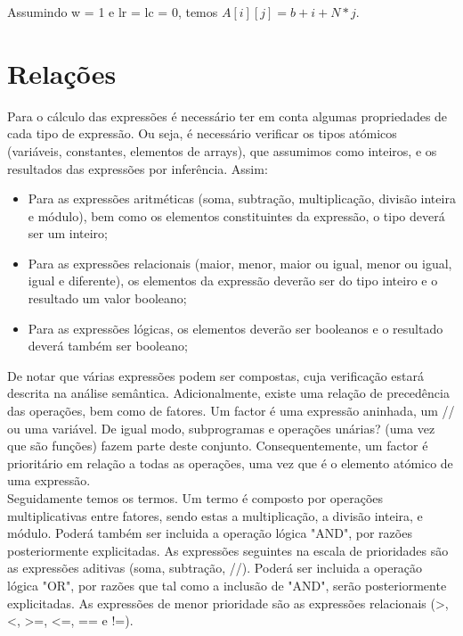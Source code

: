 Assumindo w = 1 e lr = lc = 0, temos $A[i][j] = b + i + N * j$.\\

\section{Relações}
\label{sec:relacoes:analise}

Para o cálculo das expressões é necessário ter em conta algumas propriedades de cada tipo de expressão. Ou seja, é necessário verificar os tipos atómicos (variáveis, constantes, elementos de arrays), que assumimos como inteiros, e os resultados das expressões por inferência. Assim:\\
\begin{itemize}
\item Para as expressões aritméticas (soma, subtração, multiplicação, divisão inteira e módulo), bem como os elementos constituintes da expressão, o tipo deverá ser um inteiro;
\item Para as expressões relacionais (maior, menor, maior ou igual, menor ou igual, igual e diferente), os elementos da expressão deverão ser do tipo inteiro e o resultado um valor booleano;
\item Para as expressões lógicas, os elementos deverão ser booleanos e o resultado deverá também ser booleano;
\end{itemize}

De notar que várias expressões podem ser compostas, cuja verificação estará descrita na análise semântica. Adicionalmente, existe uma relação de precedência das operações, bem como de fatores. Um factor é uma expressão aninhada, um // ou uma variável. De igual modo, subprogramas e operações unárias? (uma vez que são funções) fazem parte deste conjunto. Consequentemente, um factor é prioritário em relação a todas as operações, uma vez que é o elemento atómico de uma expressão.\\

Seguidamente temos os termos. Um termo é composto por operações multiplicativas entre fatores, sendo estas a multiplicação, a divisão inteira, e módulo. Poderá também ser incluida a operação lógica "AND", por razões posteriormente explicitadas. As expressões seguintes na escala de prioridades são as expressões aditivas (soma, subtração, //). Poderá ser incluida a operação lógica "OR", por razões que tal como a inclusão de "AND", serão posteriormente explicitadas. As expressões de menor prioridade são as expressões relacionais (>, <, >=, <=, == e !=).\\

